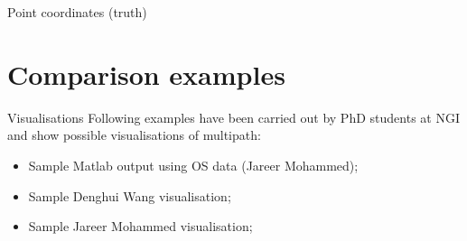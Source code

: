 \documentclass[11pt]{beamer}
\begin{document}
{ 

\begin{frame}{Point coordinates (truth)}
	\begin{table}
		\centering
		\begin{minipage}[t]{\textwidth}%
			\caption{OSGB coordinates for the Project 1}
		\end{minipage}
	\end{table}
	
\end{frame}
} %



\section{Comparison examples}

	\begin{frame}{Visualisations}
		Following examples have been carried out by PhD students at NGI and show possible visualisations of multipath:
		
		\begin{itemize}
			\item Sample Matlab output using OS data (Jareer Mohammed);
			\item Sample Denghui Wang visualisation;
			\item Sample Jareer Mohammed visualisation;
		\end{itemize}

	\end{frame}
\end{document}
